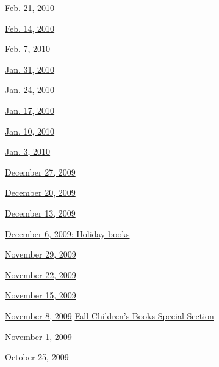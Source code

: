 \href{http://www.nytimes3xbfgragh.onion/indexes/2010/02/20/books/review/index.html}{Feb.
21, 2010}

\href{http://www.nytimes3xbfgragh.onion/indexes/2010/02/13/books/review/index.html}{Feb.
14, 2010}

\href{http://www.nytimes3xbfgragh.onion/indexes/2010/02/06/books/review/index.html}{Feb.
7, 2010}

\href{http://www.nytimes3xbfgragh.onion/indexes/2010/01/30/books/review/index.html}{Jan.
31, 2010}

\href{http://www.nytimes3xbfgragh.onion/indexes/2010/01/23/books/review/index.html}{Jan.
24, 2010}

\href{http://www.nytimes3xbfgragh.onion/indexes/2010/01/16/books/review/index.html}{Jan.
17, 2010}

\href{http://www.nytimes3xbfgragh.onion/indexes/2010/01/09/books/review/index.html}{Jan.
10, 2010}

\href{http://www.nytimes3xbfgragh.onion/indexes/2010/01/02/books/review/index.html}{Jan.
3, 2010}

\href{http://www.nytimes3xbfgragh.onion/indexes/2009/12/26/books/review/index.html}{December
27, 2009}

\href{http://www.nytimes3xbfgragh.onion/indexes/2009/12/19/books/review/index.html}{December
20, 2009}

\href{http://www.nytimes3xbfgragh.onion/indexes/2009/12/12/books/review/index.html}{December
13, 2009}

\href{http://www.nytimes3xbfgragh.onion/indexes/2009/12/05/books/review/index.html}{December
6, 2009: Holiday books}

\href{http://www.nytimes3xbfgragh.onion/indexes/2009/11/28/books/review/index.html}{November
29, 2009}

\href{http://www.nytimes3xbfgragh.onion/indexes/2009/11/21/books/review/index.html}{November
22, 2009}

\href{http://www.nytimes3xbfgragh.onion/indexes/2009/11/14/books/review/index.html}{November
15, 2009}

\href{http://www.nytimes3xbfgragh.onion/indexes/2009/11/07/books/review/index.html}{November
8, 2009} \textbar{}
\href{http://www.nytimes3xbfgragh.onion/indexes/2009/11/07/arts/artsspecial/index.html}{Fall
Children's Books Special Section}

\href{http://www.nytimes3xbfgragh.onion/indexes/2009/10/31/books/review/index.html}{November
1, 2009}

\href{http://www.nytimes3xbfgragh.onion/indexes/2009/10/24/books/review/index.html}{October
25, 2009}

